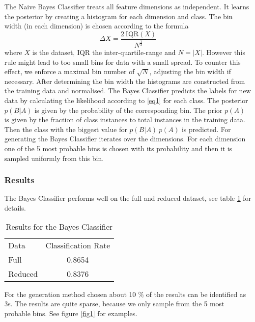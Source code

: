 \documentclass[draft]{article}
\begin{document}
The Naive Bayes Classifier treats all feature dimensions as independent. It learns the posterior by creating a histogram 
for each dimension and class. The bin width (in each dimension) is chosen according to the formula
\begin{equation}
	\Delta X = \frac{2 ~ \mathrm{IQR}(X)}{N^{\frac{1}{3}}}
\end{equation}
where $X$ is the dataset, IQR the inter-quartile-range and $N = |X|$. However this 
rule might lead to too small bins for data with a small spread. To counter this effect,
we enforce a maximal bin number of $\sqrt{N}$, adjusting the bin width if necessary.
After determining the bin width the histograms are constructed from the training data and normalised.
\newline
The Bayes Classifier predicts the labels for new data by calculating the likelihood according to
\ref{eq1} for each class. The posterior $p(B|A)$ is given by the probability of the corresponding bin.
The prior $p(A)$ is given by the fraction of class instances to total instances in the training data.
Then the class with the biggest value for $p(B|A) ~ p(A)$ is predicted.
\newline
For generating the Bayes Classifier iterates over the dimensions.
For each dimension one of the 5 most probable bins is chosen with its probability and 
then it is sampled uniformly from this bin.

\subsubsection{Results}

The Bayes Classifier performs well on the full and reduced dataset, see table \ref{tab1} for details.
	
\begin{table}[h]
	\centering
	\begin{tabular}{l c}
		Data	&	Classification Rate	\\
		Full	&	0.8654				\\
	 	Reduced & 	0.8376				\\
	\end{tabular}
	\caption{Results for the Bayes Classifier}
	\label{tab1}
\end{table}

For the generation method chosen about 10 \% of the results can be identified as 3s.
The results are quite sparse, because we only sample from the 5 most probable bins.
See figure \ref{fig1} for examples.
\end{document}
